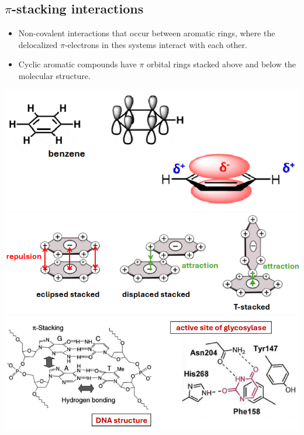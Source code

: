 \documentclass[10pt]{article}
\begin{document}
\subsection*{$\pi$-stacking interactions}
\begin{itemize}
    \item Non-covalent interactions that occur between aromatic rings, where the delocalized $\pi$-electrons in thes systems interact with each other.
    \item Cyclic aromatic compounds have $\pi$ orbital rings stacked above and below the molecular structure.
\end{itemize}
\begin{center}
    \includegraphics[scale=0.8]{L3_5.png}
    \includegraphics[width=\textwidth]{L3_6.png}
    \includegraphics[width=\textwidth]{L3_7.png}
\end{center}
\end{document}
